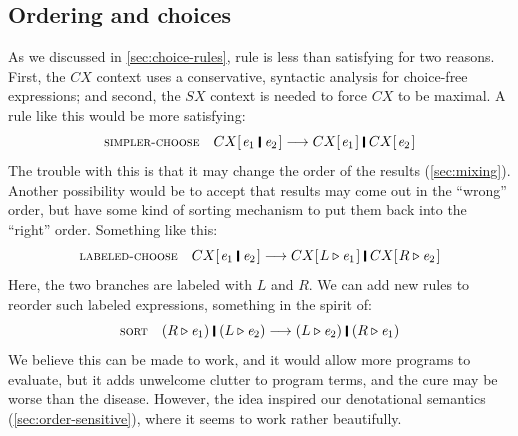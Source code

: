 \documentclass[acmsmall]{acmart}
\newcommand{\Conid}[1]{\mathit{#1}}
\newcommand{\Varid}[1]{\mathit{#1}}
\newcommand{\simon}[1]{{\color{dkblue} [{SLPJ}: #1]}}
\newcommand{\lennart}[1]{{\color{dkcyan} [{LA}: #1]}}
\newcommand{\simon}[1]{}
\newcommand{\lennart}[1]{}
\begin{document}
%
%

\subsection{Ordering and choices} \label{sec:ord-choice}

As we discussed in \cref{sec:choice-rules}, rule  is less than satisfying for two reasons.
First, the \ensuremath{CX} context uses a conservative, syntactic analysis for choice-free expressions; and second,
the \ensuremath{\Conid{SX}} context is needed to force \ensuremath{CX} to be maximal.  A rule like this would be more satisfying:
$$
\rulename{simpler-choose} \quad   \ensuremath{CX [\mskip1.5mu \Varid{e}_{\mathrm{1}}\;\rule[-0.1em]{0.15em}{0.75em}\;\Varid{e}_{\mathrm{2}}\mskip1.5mu]} \movesto \ensuremath{CX [\mskip1.5mu \Varid{e}_{\mathrm{1}}\mskip1.5mu]\;\rule[-0.1em]{0.15em}{0.75em}\;CX [\mskip1.5mu \Varid{e}_{\mathrm{2}}\mskip1.5mu]}
$$
The trouble with this is that it may change the order of the results (\cref{sec:mixing}).
Another possibility would be to accept that results may come out in the ``wrong'' order, but have
some kind of sorting mechanism to put them back into the ``right'' order.  Something like this:
$$
\rulename{labeled-choose} \quad   \ensuremath{CX [\mskip1.5mu \Varid{e}_{\mathrm{1}}\;\rule[-0.1em]{0.15em}{0.75em}\;\Varid{e}_{\mathrm{2}}\mskip1.5mu]} \movesto \ensuremath{CX [\mskip1.5mu L \triangleright\Varid{e}_{\mathrm{1}}\mskip1.5mu]\;\rule[-0.1em]{0.15em}{0.75em}\;CX [\mskip1.5mu R \triangleright\Varid{e}_{\mathrm{2}}\mskip1.5mu]}
$$
Here, the two branches are labeled with \ensuremath{\Conid{L}} and \ensuremath{\Conid{R}}.  We can add new rules to reorder such
labeled expressions, something in the spirit of:
$$
\rulename{sort} \quad   \ensuremath{(R \triangleright\Varid{e}_{\mathrm{1}})\;\rule[-0.1em]{0.15em}{0.75em}\;(L \triangleright\Varid{e}_{\mathrm{2}})} \movesto \ensuremath{(L \triangleright\Varid{e}_{\mathrm{2}})\;\rule[-0.1em]{0.15em}{0.75em}\;(R \triangleright\Varid{e}_{\mathrm{1}})}
$$
We believe this can be made to work, and it would allow more programs to evaluate, but it adds unwelcome clutter to program terms, and the cure may be worse than the disease. However, the idea inspired our denotational
semantics (\cref{sec:order-sensitive}), where it seems to work rather beautifully.
\end{document}
